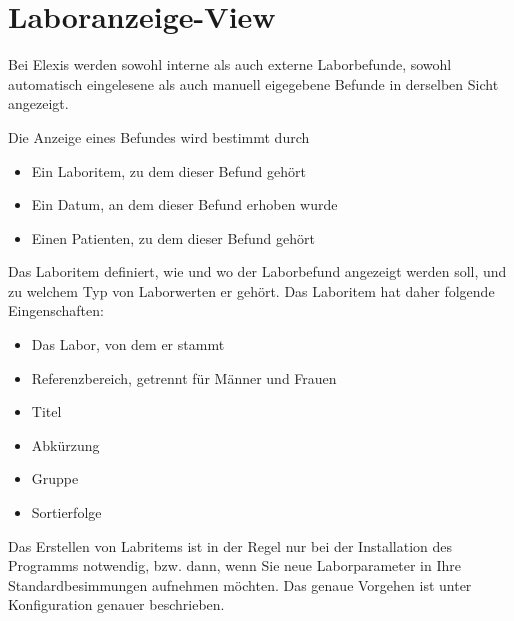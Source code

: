 
\section{Laboranzeige-View}
Bei Elexis werden sowohl interne als auch externe Laborbefunde, sowohl
automatisch eingelesene als auch manuell eigegebene Befunde in derselben Sicht
angezeigt. 

Die  Anzeige eines Befundes wird bestimmt durch
\begin{itemize}
  \item Ein Laboritem, zu dem dieser Befund gehört
  \item Ein Datum, an dem dieser Befund erhoben wurde
  \item Einen Patienten, zu dem dieser Befund gehört
\end{itemize}

Das Laboritem definiert, wie und wo der Laborbefund angezeigt werden soll, und
zu welchem Typ von Laborwerten er gehört.
Das Laboritem hat daher folgende Eingenschaften:
\begin{itemize}
  \item Das Labor, von dem er stammt
  \item Referenzbereich, getrennt für Männer und Frauen
  \item Titel
  \item Abkürzung
  \item Gruppe
  \item Sortierfolge
\end{itemize}

Das Erstellen von Labritems ist in der Regel nur bei der Installation des
Programms notwendig, bzw. dann, wenn Sie neue Laborparameter in Ihre
Standardbesimmungen aufnehmen möchten.
Das genaue Vorgehen ist unter Konfiguration genauer beschrieben.

